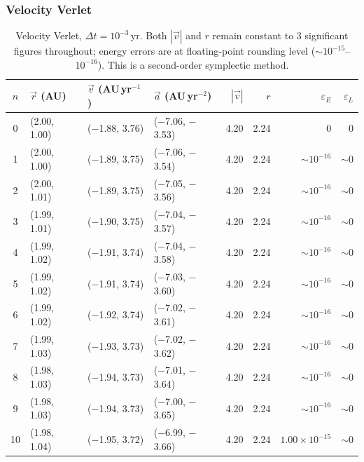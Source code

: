 \subsubsection*{Velocity Verlet}

\begin{table}[H]
    \centering
    \scriptsize
    \setlength{\tabcolsep}{4pt}
    \begin{tabular}{c l l l r r r r}
        \hline
        $n$ & $\vec{r}$ (AU) & $\vec{v}$ (AU\,yr$^{-1}$) & $\vec{a}$ (AU\,yr$^{-2}$) & $|\vec{v}|$ & $r$ & $\varepsilon_E$ & $\varepsilon_L$ \\
        \hline
        0  & (2.00, 1.00) & ($-$1.88, 3.76)  & ($-$7.06, $-$3.53) & 4.20 & 2.24 & $0$ & $0$ \\
        1  & (2.00, 1.00) & ($-$1.89, 3.75)  & ($-$7.06, $-$3.54) & 4.20 & 2.24 & $\sim\!10^{-16}$ & $\sim\!0$ \\
        2  & (2.00, 1.01) & ($-$1.89, 3.75)  & ($-$7.05, $-$3.56) & 4.20 & 2.24 & $\sim\!10^{-16}$ & $\sim\!0$ \\
        3  & (1.99, 1.01) & ($-$1.90, 3.75)  & ($-$7.04, $-$3.57) & 4.20 & 2.24 & $\sim\!10^{-16}$ & $\sim\!0$ \\
        4  & (1.99, 1.02) & ($-$1.91, 3.74)  & ($-$7.04, $-$3.58) & 4.20 & 2.24 & $\sim\!10^{-16}$ & $\sim\!0$ \\
        5  & (1.99, 1.02) & ($-$1.91, 3.74)  & ($-$7.03, $-$3.60) & 4.20 & 2.24 & $\sim\!10^{-16}$ & $\sim\!0$ \\
        6  & (1.99, 1.02) & ($-$1.92, 3.74)  & ($-$7.02, $-$3.61) & 4.20 & 2.24 & $\sim\!10^{-16}$ & $\sim\!0$ \\
        7  & (1.99, 1.03) & ($-$1.93, 3.73)  & ($-$7.02, $-$3.62) & 4.20 & 2.24 & $\sim\!10^{-16}$ & $\sim\!0$ \\
        8  & (1.98, 1.03) & ($-$1.94, 3.73)  & ($-$7.01, $-$3.64) & 4.20 & 2.24 & $\sim\!10^{-16}$ & $\sim\!0$ \\
        9  & (1.98, 1.03) & ($-$1.94, 3.73)  & ($-$7.00, $-$3.65) & 4.20 & 2.24 & $\sim\!10^{-16}$ & $\sim\!0$ \\
        10 & (1.98, 1.04) & ($-$1.95, 3.72)  & ($-$6.99, $-$3.66) & 4.20 & 2.24 & $1.00\!\times\!10^{-15}$ & $\sim\!0$ \\
        \hline
    \end{tabular}
    \caption{Velocity Verlet, $\Delta t = 10^{-3}$\,yr. Both $|\vec{v}|$ and $r$ remain constant to 3 significant figures throughout; energy errors are at floating-point rounding level ($\sim\!10^{-15}$--$10^{-16}$). This is a second-order symplectic method.}
\end{table}

